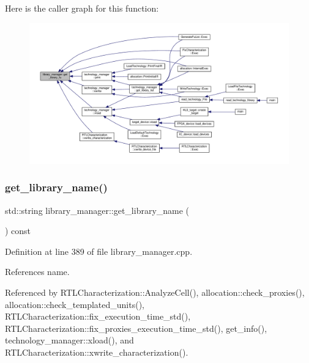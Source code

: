 Here is the caller graph for this function\+:
\nopagebreak
\begin{figure}[H]
\begin{center}
\leavevmode
\includegraphics[width=350pt]{d8/d35/classlibrary__manager_a5e6cca29a6c2e2f96563c059371cd79e_icgraph}
\end{center}
\end{figure}
\mbox{\label{classlibrary__manager_a7e17dbc69eacaabce39da9168451c3c8}} 
\subsubsection{\texorpdfstring{get\+\_\+library\+\_\+name()}{get\_library\_name()}}
{\footnotesize\ttfamily std\+::string library\+\_\+manager\+::get\+\_\+library\+\_\+name (\begin{DoxyParamCaption}{ }\end{DoxyParamCaption}) const}



Definition at line 389 of file library\+\_\+manager.\+cpp.



References name.



Referenced by R\+T\+L\+Characterization\+::\+Analyze\+Cell(), allocation\+::check\+\_\+proxies(), allocation\+::check\+\_\+templated\+\_\+units(), R\+T\+L\+Characterization\+::fix\+\_\+execution\+\_\+time\+\_\+std(), R\+T\+L\+Characterization\+::fix\+\_\+proxies\+\_\+execution\+\_\+time\+\_\+std(), get\+\_\+info(), technology\+\_\+manager\+::xload(), and R\+T\+L\+Characterization\+::xwrite\+\_\+characterization().

